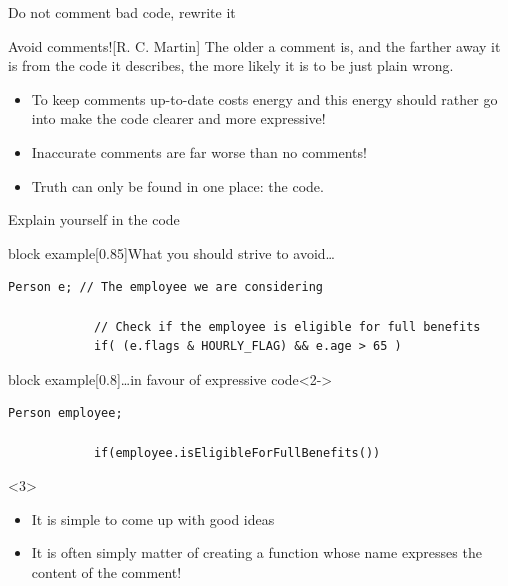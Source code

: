 \begin{frame}{Do not comment bad code, rewrite it}
\begin{onlyenv}
\begin{quoteblock}{Avoid comments!}[R. C. Martin]
            The older a comment is, and the farther away it is from the code it describes, the more likely
            it is to be just plain wrong.
        \end{quoteblock}
        \begin{itemize}
            \item To keep comments up-to-date costs energy and this energy should rather go into make the code clearer and more expressive!
            \item Inaccurate comments are far worse than no comments!
            \item \alert{Truth can only be found in one place: the code.}
        \end{itemize}
    \end{onlyenv}
\end{frame}
\begin{frame}[fragile]{Explain yourself in the code}
    \vspace{-5mm}
    \begin{varblock}{block example}[0.85\textwidth]{What you should strive to avoid\ldots}
        \begin{lstlisting}[style=MyCpp]
            Person e; // The employee we are considering

            // Check if the employee is eligible for full benefits
            if( (e.flags & HOURLY_FLAG) && e.age > 65 )
        \end{lstlisting}
    \end{varblock}
    \begin{varblock}{block example}[0.8\textwidth]{\ldots{}in favour of expressive code}<2->
        \begin{lstlisting}[style=MyCpp]
            Person employee;

            if(employee.isEligibleForFullBenefits())
        \end{lstlisting}
    \end{varblock}
    \begin{uncoverenv}<3>
        \begin{itemize}
            \item It is simple to come up with good ideas
            \item It is often simply matter of creating a function whose name expresses the content of the comment!
        \end{itemize}
    \end{uncoverenv}
\end{frame}
